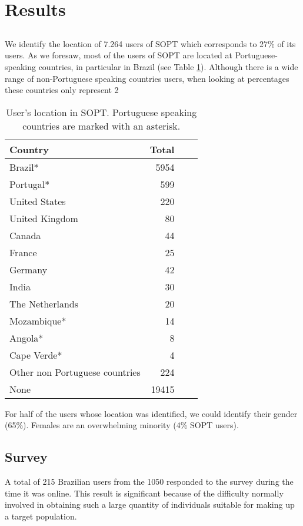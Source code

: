 \section{Results}
\subsection{}
We identify the location of 7.264 users of SOPT which corresponds to 27\% of its users. As we foresaw, most of the users of SOPT are located at Portuguese-speaking countries, in particular in Brazil (see Table \ref{tbl:Locations}). Although there is a wide range of non-Portuguese speaking countries users, when looking at percentages these countries only represent 2%

\begin{table}[ht]
\begin{center}
\scriptsize{
\begin{tabular}{lrrr}
Country & Total \\
\hline
Brazil* 			& 5954 \\
Portugal* 			& 599 \\
United States 		& 220 \\
United Kingdom      & 80 \\
Canada				& 44 \\
France              & 25 \\
Germany				& 42 \\
India				& 30 \\
The Netherlands		& 20 \\
Mozambique*		    & 14 \\
Angola*		 		& 8 \\
Cape Verde*		    & 4 \\
Other non Portuguese countries		 & 224 \\
None 				& 19415 \\
\end{tabular}
\caption{User's location in SOPT. Portuguese speaking countries are marked with an asterisk.}
\label{tbl:Locations}
}
\end{center}
\end{table}

For half of the users whose location was identified, we could identify their gender (65\%). Females are an overwhelming minority (4\% SOPT users).

\subsection{Survey}
A total of 215 Brazilian users from the 1050 responded to the survey during the time it was online. This result is significant because of the difficulty normally involved in obtaining such a large quantity of individuals suitable for making up a target population. 

